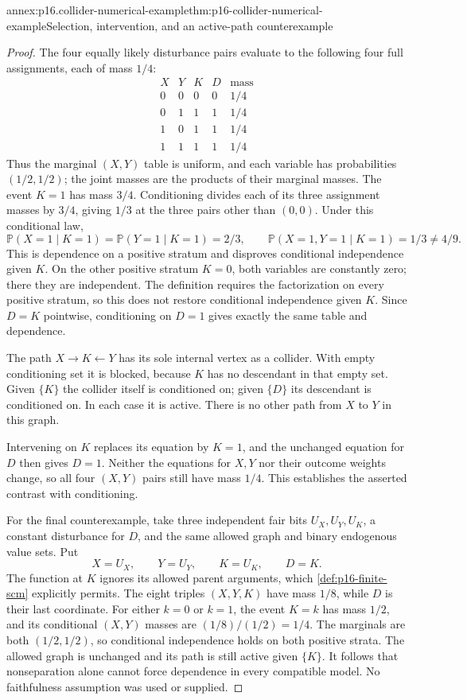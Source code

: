 \begin{annexitem}{annex:p16.collider-numerical-example}{thm:p16-collider-numerical-example}{Selection, intervention, and an active-path counterexample}
\begin{proof}
The four equally likely disturbance pairs evaluate to the following
four full assignments, each of mass \(1/4\):
\[
\begin{array}{cccc|c}
 X&Y&K&D&\text{mass}\\\hline
 0&0&0&0&1/4\\
 0&1&1&1&1/4\\
 1&0&1&1&1/4\\
 1&1&1&1&1/4
\end{array}
\]
Thus the marginal \((X,Y)\) table is uniform, and each variable
has probabilities \((1/2,1/2)\); the joint masses are the products
of their marginal masses. The event \(K=1\) has mass \(3/4\).
Conditioning divides each of its three assignment masses by \(3/4\),
giving \(1/3\) at the three pairs other than \((0,0)\).
Under this conditional law,
\[
 \mathbb P(X=1\mid K=1)=\mathbb P(Y=1\mid K=1)=2/3,
 \qquad \mathbb P(X=1,Y=1\mid K=1)=1/3\ne4/9.
\]
This is dependence on a positive stratum and disproves conditional
independence given \(K\). On the other positive stratum \(K=0\),
both variables are constantly zero; there they are independent.
The definition requires the factorization on every positive stratum,
so this does not restore conditional independence given \(K\).
Since \(D=K\) pointwise, conditioning on \(D=1\) gives exactly
the same table and dependence.

The path \(X\to K\leftarrow Y\) has its sole internal vertex
as a collider. With empty conditioning set it is blocked, because
\(K\) has no descendant in that empty set. Given \(\{K\}\)
the collider itself is conditioned on; given \(\{D\}\) its
descendant is conditioned on. In each case it is active. There is
no other path from \(X\) to \(Y\) in this graph.

Intervening on \(K\) replaces its equation by \(K=1\), and the
unchanged equation for \(D\) then gives \(D=1\). Neither the
equations for \(X,Y\) nor their outcome weights change, so all
four \((X,Y)\) pairs still have mass \(1/4\). This establishes
the asserted contrast with conditioning.

For the final counterexample, take three independent fair bits
\(U_X,U_Y,U_K\), a constant disturbance for \(D\), and the
same allowed graph and binary endogenous value sets. Put
\[
 X=U_X,\qquad Y=U_Y,\qquad K=U_K,\qquad D=K.
\]
The function at \(K\) ignores its allowed parent arguments,
which \cref{def:p16-finite-scm} explicitly permits. The eight triples
\((X,Y,K)\) have mass \(1/8\), while \(D\) is their last
coordinate. For either \(k=0\) or \(k=1\), the event \(K=k\)
has mass \(1/2\), and its conditional \((X,Y)\) masses are
\((1/8)/(1/2)=1/4\). The marginals are both \((1/2,1/2)\),
so conditional independence holds on both positive strata. The allowed
graph is unchanged and its path is still active given \(\{K\}\).
It follows that nonseparation alone cannot force dependence in every
compatible model. No faithfulness assumption was used or supplied.
\end{proof}
\end{annexitem}
